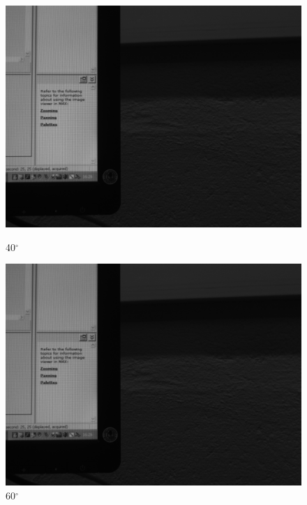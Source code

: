 \documentclass{article}
\begin{document}
\begin{figure}[H]
\begin{minipage}[b]{0.16\linewidth}
\includegraphics[width=1.0\textwidth,natwidth=100,natheight=100]{../LMS/im40.png}
  \caption{40$^\circ$}
  \label{fig:lms11-3}
\end{minipage}
\quad
\begin{minipage}[b]{0.16\linewidth}
\includegraphics[width=1.0\textwidth,natwidth=100,natheight=100]{../LMS/im60.png}
  \caption{60$^\circ$}
  \label{fig:lms11-4}
\end{minipage}
\quad
\begin{minipage}[b]{0.16\linewidth}

\end{minipage}
\end{figure}
\end{document}
